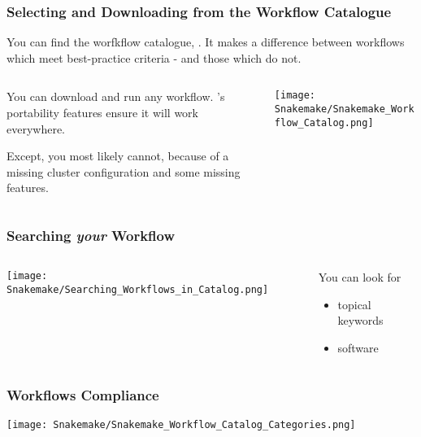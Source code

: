 \begin{frame}
 \frametitle{Selecting and Downloading from the Workflow Catalogue}
 You can find the \Snakemake{} worfkflow catalogue, . It makes a difference between workflows which meet best-practice criteria - and those which do not.\newline
 \begin{columns}
   \begin{column}{0.5\textwidth}
     You can download and run any workflow. \Snakemake's portability features ensure it will work everywhere.\pause
     \begin{warning}
     	Except, you most likely cannot, because of a missing cluster configuration and some missing features.
     \end{warning}
   \end{column}
   \begin{column}{0.5\textwidth}
     \texttt{[image: Snakemake/Snakemake\_Workflow\_Catalog.png]}
   \end{column}
 \end{columns}
\end{frame}

\begin{frame}
  \frametitle{Searching \emph{your} Workflow}
   \begin{columns}
  	\begin{column}{0.5\textwidth}
  		\texttt{[image: Snakemake/Searching\_Workflows\_in\_Catalog.png]}
  	\end{column}
  	\begin{column}{0.5\textwidth}
  		You can look for 
  		\begin{itemize}
  		  \item topical keywords
  		  \item software
  		\end{itemize}
  	\end{column}
  \end{columns}
\end{frame}

\begin{frame}
	\frametitle{Workflows Compliance}
	\begin{question}
	  \texttt{[image: Snakemake/Snakemake\_Workflow\_Catalog\_Categories.png]}
	\end{question}
\end{frame}

